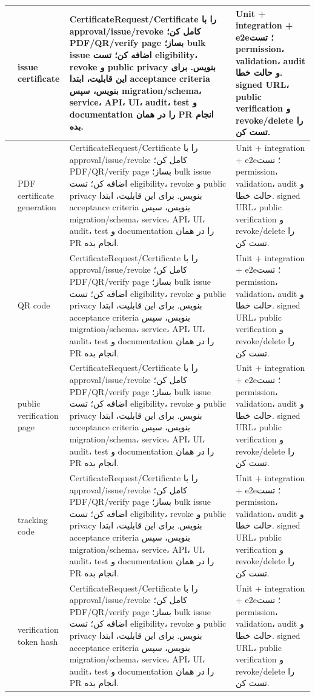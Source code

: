 \documentclass[11pt,a4paper]{article}
\begin{document}
\begin{longtable}{|>{\raggedleft\arraybackslash}p{}|>{\raggedleft\arraybackslash}p{}|>{\raggedleft\arraybackslash}p{}|>{\raggedleft\arraybackslash}p{}|}
205 & issue certificate & CertificateRequest/Certificate را با approval/issue/revoke کامل کن؛ PDF/QR/verify page بساز؛ bulk issue اضافه کن؛ تست eligibility، revoke و public privacy بنویس. برای این قابلیت، ابتدا acceptance criteria بنویس، سپس migration/schema، service، API، UI، audit، test و documentation را در همان PR انجام بده. & Unit + integration + e2e؛ تست permission، validation، audit و حالت خطا. signed URL، public verification و revoke/delete را تست کن. \\ \hline
206 & PDF certificate generation & CertificateRequest/Certificate را با approval/issue/revoke کامل کن؛ PDF/QR/verify page بساز؛ bulk issue اضافه کن؛ تست eligibility، revoke و public privacy بنویس. برای این قابلیت، ابتدا acceptance criteria بنویس، سپس migration/schema، service، API، UI، audit، test و documentation را در همان PR انجام بده. & Unit + integration + e2e؛ تست permission، validation، audit و حالت خطا. signed URL، public verification و revoke/delete را تست کن. \\ \hline
207 & QR code & CertificateRequest/Certificate را با approval/issue/revoke کامل کن؛ PDF/QR/verify page بساز؛ bulk issue اضافه کن؛ تست eligibility، revoke و public privacy بنویس. برای این قابلیت، ابتدا acceptance criteria بنویس، سپس migration/schema، service، API، UI، audit، test و documentation را در همان PR انجام بده. & Unit + integration + e2e؛ تست permission، validation، audit و حالت خطا. signed URL، public verification و revoke/delete را تست کن. \\ \hline
208 & public verification page & CertificateRequest/Certificate را با approval/issue/revoke کامل کن؛ PDF/QR/verify page بساز؛ bulk issue اضافه کن؛ تست eligibility، revoke و public privacy بنویس. برای این قابلیت، ابتدا acceptance criteria بنویس، سپس migration/schema، service، API، UI، audit، test و documentation را در همان PR انجام بده. & Unit + integration + e2e؛ تست permission، validation، audit و حالت خطا. signed URL، public verification و revoke/delete را تست کن. \\ \hline
209 & tracking code & CertificateRequest/Certificate را با approval/issue/revoke کامل کن؛ PDF/QR/verify page بساز؛ bulk issue اضافه کن؛ تست eligibility، revoke و public privacy بنویس. برای این قابلیت، ابتدا acceptance criteria بنویس، سپس migration/schema، service، API، UI، audit، test و documentation را در همان PR انجام بده. & Unit + integration + e2e؛ تست permission، validation، audit و حالت خطا. signed URL، public verification و revoke/delete را تست کن. \\ \hline
210 & verification token hash & CertificateRequest/Certificate را با approval/issue/revoke کامل کن؛ PDF/QR/verify page بساز؛ bulk issue اضافه کن؛ تست eligibility، revoke و public privacy بنویس. برای این قابلیت، ابتدا acceptance criteria بنویس، سپس migration/schema، service، API، UI، audit، test و documentation را در همان PR انجام بده. & Unit + integration + e2e؛ تست permission، validation، audit و حالت خطا. signed URL، public verification و revoke/delete را تست کن. \\ \hline

\end{longtable}
\end{document}

